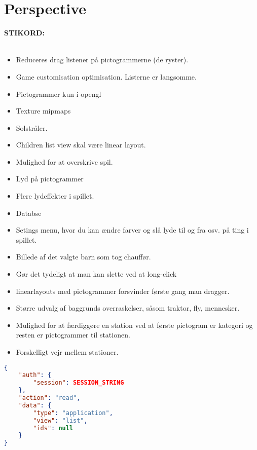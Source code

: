 \chapter{Perspective}
\textbf{STIKORD:}\\\\
\begin{itemize}
\item Reduceres drag listener på pictogrammerne (de ryster).
\item Game customisation optimisation. Listerne er langsomme.
\item Pictogrammer kun i opengl
\item Texture mipmaps
\item Solstråler.
\item Children list view skal være linear layout.
\item Mulighed for at overskrive spil.
\item Lyd på pictogrammer
\item Flere lydeffekter i spillet.
\item Databse 
\item Setings menu, hvor du kan ændre farver og slå lyde til og fra osv. på ting i spillet.
\item Billede af det valgte barn som tog chauffør.
\item Gør det tydeligt at man kan slette ved at long-click
\item linearlayouts med pictogrammer forsvinder første gang man dragger.
\item Større udvalg af baggrunds overraskelser, såsom traktor, fly, mennesker.
\item Mulighed for at færdiggøre en station ved at første pictogram er kategori og resten er pictogrammer til stationen.
\item Forskelligt vejr mellem stationer.

\end{itemize}
\begin{lstlisting}[language=json,firstnumber=1,caption={JSON guery to read application data},label=lst:jsonread]
{
	"auth": {
		"session": SESSION_STRING
	},
	"action": "read",
	"data": {
		"type": "application",
		"view": "list",
		"ids": null
	}
}
\end{lstlisting} 
